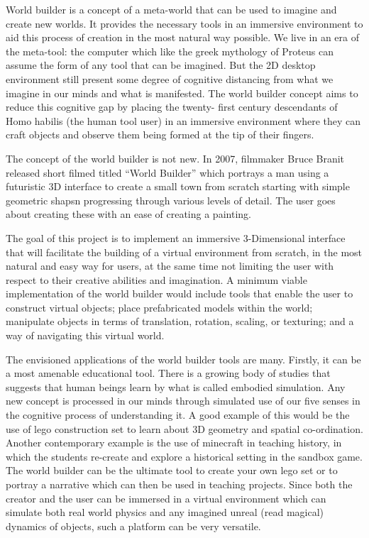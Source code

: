 World builder is a concept of a meta-world that can be used to imagine and create new worlds. It provides the necessary tools in an immersive
environment to aid this process of creation in the most natural way possible. We live in an era of the meta-tool: the computer which like the greek 
mythology of Proteus can assume the form of any tool that can be imagined. But the 2D desktop environment still present some degree of cognitive 
distancing from what we imagine in our minds and what is manifested. The world builder concept aims to reduce this cognitive gap by placing the twenty-
first century descendants of Homo habilis (the human tool user) in an immersive environment where they can craft objects and observe them being formed
at the tip of their fingers.


The concept of the world builder is not new. In 2007, filmmaker Bruce Branit released short filmed titled ``World Builder'' \cite{video:WorldBuilder}
which portrays a man using a futuristic 3D interface to create a small town from scratch starting with simple geometric shapsn progressing through
various levels of detail.  The user goes about creating these with an ease of creating a painting.


The goal of this project is to implement an immersive 3-Dimensional interface that will facilitate the building of a virtual environment from scratch, in
the most natural and easy way for users, at the same time not limiting the user with respect to their creative abilities and imagination. A 
minimum viable implementation of the world builder would include tools that enable the user to construct virtual objects; place prefabricated models 
within the world; manipulate objects in terms of translation, rotation, scaling, or texturing; and a way of navigating this virtual world.


The envisioned applications of the world builder tools are many. Firstly, it can be a most amenable educational tool. There is a growing body of studies 
that suggests that human beings learn by what is called embodied simulation. Any new concept is processed in our minds through simulated use of our five
senses in the cognitive process of understanding it. A good example of this would be the use of lego construction set to learn about 3D geometry and 
spatial co-ordination.  Another contemporary example is the use of minecraft in teaching history, in which the students re-create and explore a 
historical setting in the sandbox game. The world builder can be the ultimate tool to create your own lego set or to portray a narrative which can then
be used in teaching projects. Since both the creator and the user can be immersed in a virtual environment which can simulate both real world physics 
and any imagined unreal (read magical) dynamics of objects, such a platform can be very versatile. 


